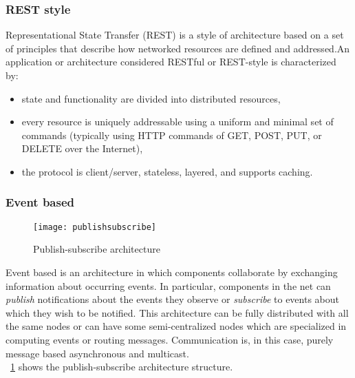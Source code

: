 \subsubsection{REST style} Representational State Transfer (REST) is a style of architecture based on a set of principles that describe how networked resources are defined and addressed.An application or architecture considered RESTful or REST-style is characterized by:
\begin{itemize}
	\item state and functionality are divided into distributed resources,
	\item every resource is uniquely addressable using a uniform and minimal set of commands (typically using HTTP commands of GET, POST, PUT, or DELETE over the Internet),
	\item the protocol is client/server, stateless, layered, and supports caching.
\end{itemize}



\subsubsection{Event based}
\begin{figure}[h]
	\centering
	\texttt{[image: publishsubscribe]}
	\caption{Publish-subscribe architecture}
	\label{fig:2.14}
\end{figure}
Event based is an architecture in which components collaborate by exchanging information about occurring events. In particular, components in the net can \textit{publish} notifications about the events they observe or \textit{subscribe} to events about which they wish to be notified. This architecture can be fully distributed with all the same nodes or can have some semi-centralized nodes which are specialized in computing events or routing messages. Communication is, in this case, purely message based asynchronous and multicast.\\
\figurename~\ref{fig:2.14} shows the publish-subscribe architecture structure. 


